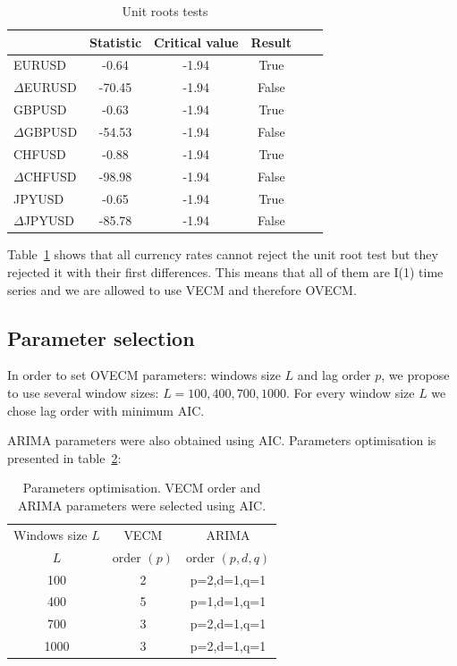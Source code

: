 \begin{table}[h!]
\caption{Unit roots tests}
\label{tab:adf}
\begin{center}
\begin{tabular}{|l|c|c|c|c|c|}
\hline
& \textbf{Statistic} & \textbf{Critical value} & \textbf{Result}\\
\hline
EURUSD          & -0.64 & -1.94 & True       \\
$\Delta$EURUSD & -70.45   & -1.94 & False       \\
GBPUSD          & -0.63   & -1.94 & True          \\
$\Delta$GBPUSD & -54.53   & -1.94 & False       \\
CHFUSD          & -0.88   & -1.94 & True         \\
$\Delta$CHFUSD & -98.98   & -1.94 & False       \\
JPYUSD          & -0.65 & -1.94 & True        \\
$\Delta$JPYUSD & -85.78 & -1.94 & False     \\ 
\hline
\end{tabular}
\end{center}
\end{table}


Table~\ref{tab:adf} shows that all currency rates cannot reject the unit root
test but they rejected it with their first differences. This means that all of
them are I(1) time series and we are allowed to use VECM and therefore OVECM.


\subsection{Parameter selection} \label{sec:paramselection}

In order to set OVECM parameters: windows size $L$ and lag order $p$,
we propose to use several window sizes: $L = 100, 400, 700, 1000$. For every window size $L$ we chose lag order with minimum AIC.

ARIMA parameters were also obtained using AIC.
Parameters optimisation is presented in table~\ref{tab:params}:

\begin{table}[ht]
\caption{Parameters optimisation. VECM order and ARIMA parameters were selected
using AIC.}
\label{tab:params}
\begin{center}
\begin{tabular}{|c|c|c|}
\hline
Windows size $L$ & VECM & ARIMA\\
 $L$ & order $(p)$ & order $(p,d,q)$ \\
\hline
100 & 2 & p=2,d=1,q=1\\
400 & 5 & p=1,d=1,q=1\\
700 & 3 &p=2,d=1,q=1\\
1000 &3 & p=2,d=1,q=1\\
\hline
\end{tabular}
\end{center}
\end{table}

